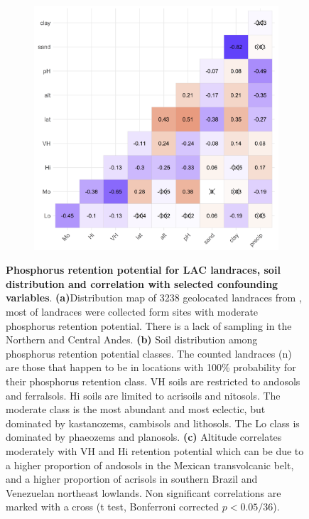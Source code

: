 \documentclass[10pt,letterpaper]{article}
\begin{document}
\begin{figure}[!b]
\begin{subfigure}{0.4\linewidth}
   \caption{}
   \label{fig:fig3c}
\end{subfigure}
\\[\baselineskip]
   \begin{subfigure}{0.5\linewidth}
   \centering
   \includegraphics[width=\linewidth]{fig3c.png}
   \caption{}
   \label{fig:fig3b} 
\end{subfigure}

\centering

\caption{\textbf{Phosphorus retention potential for LAC landraces, soil distribution and correlation with selected confounding variables}. \textbf{(a)}Distribution map of 3238 geolocated landraces from \cite{romeronavarro2017},  most of landraces were collected form sites with moderate phosphorus retention potential. There is a lack of sampling in the Northern and Central Andes. \textbf{(b)} Soil distribution among phosphorus retention potential classes. The counted landraces (n) are those that happen to be in locations with 100\% probability for their phosphorus retention class. VH soils are restricted to andosols and ferralsols. Hi soils are limited to acrisoils and nitosols. The moderate class is the most abundant and most eclectic, but dominated by kastanozems, cambisols and lithosols. The Lo class is dominated by phaeozems and planosols. \textbf{(c)} Altitude correlates moderately with VH and Hi retention potential which can be due to a higher proportion of andosols in the Mexican transvolcanic belt, and a higher  proportion of acrisols in southern Brazil and Venezuelan northeast lowlands. Non significant correlations are marked with a cross (t test, Bonferroni corrected $p < 0.05/36$).}

\label{fig3} %

\end{figure}
\end{document}
